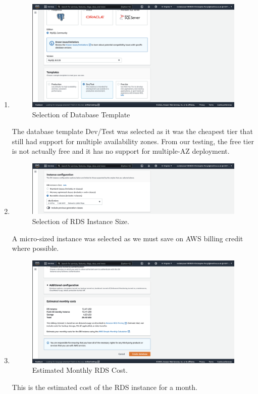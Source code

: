 \begin{enumerate}
    \item
    \begin{figure}[H]
        \centering
        \includegraphics[width=\textwidth]{resources/rds/rds-templates}
        \caption{Selection of Database Template}
        \label{fig:rds-templates}
    \end{figure}\nolinebreak
    The database template Dev/Test was selected as it was the cheapest tier that still had support for multiple availability zones. From our testing, the free tier is not actually free and it has no support for multiple-AZ deployment.

    \item
    \begin{figure}[H]
        \centering
        \includegraphics[width=\textwidth]{resources/rds/rds-instance-config}
        \caption{Selection of RDS Instance Size.}
        \label{fig:rds-instance-conf}
    \end{figure}\nolinebreak
    A micro-sized instance was selected as we must save on AWS billing credit where possible.

    \item
    \begin{figure}[H]
        \centering
        \includegraphics[width=\textwidth]{resources/rds/rds-monthly-costs}
        \caption{Estimated Monthly RDS Cost.}
        \label{fig:rds-costs}
    \end{figure}\nolinebreak
    This is the estimated cost of the RDS instance for a month.


\end{enumerate}
